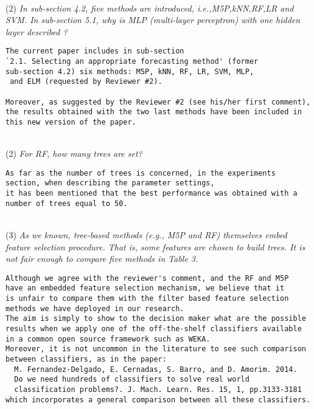 \documentclass[preprint]{elsarticle}
\begin{document}
~\\
\noindent (2) \emph{In sub-section 4.2, five methods are introduced, i.e.,M5P,kNN,RF,LR and SVM. In sub-section 5.1, why is MLP (multi-layer perceptron) with one hidden layer described ?} 

\begin{verbatim}
The current paper includes in sub-section 
`2.1. Selecting an appropriate forecasting method' (former
sub-section 4.2) six methods: M5P, kNN, RF, LR, SVM, MLP,
 and ELM (requested by Reviewer #2).

Moreover, as suggested by the Reviewer #2 (see his/her first comment), 
the results obtained with the two last methods have been included in 
this new version of the paper.
\end{verbatim}

~\\
\noindent (2) \emph{For RF, how many trees are set? }

\begin{verbatim}
As far as the number of trees is concerned, in the experiments 
section, when describing the parameter settings, 
it has been mentioned that the best performance was obtained with a 
number of trees equal to 50.
\end{verbatim}


~\\
\noindent (3) \emph{As we known, tree-based methods (e.g., M5P and RF) themselves embed feature selection procedure. That is, some features are chosen to build trees. It is not fair enough to compare five methods in Table 3. } 

\begin{verbatim}
Although we agree with the reviewer's comment, and the RF and M5P 
have an embedded feature selection mechanism, we believe that it 
is unfair to compare them with the filter based feature selection 
methods we have deployed in our research. 
The aim is simply to show to the decision maker what are the possible 
results when we apply one of the off-the-shelf classifiers available 
in a common open source framework such as WEKA. 
Moreover, it is not uncommon in the literature to see such comparison 
between classifiers, as in the paper:
  M. Fernandez-Delgado, E. Cernadas, S. Barro, and D. Amorim. 2014. 
  Do we need hundreds of classifiers to solve real world 
  classification problems?. J. Mach. Learn. Res. 15, 1, pp.3133-3181
which incorporates a general comparison between all these classifiers.
\end{verbatim}
\end{document}
